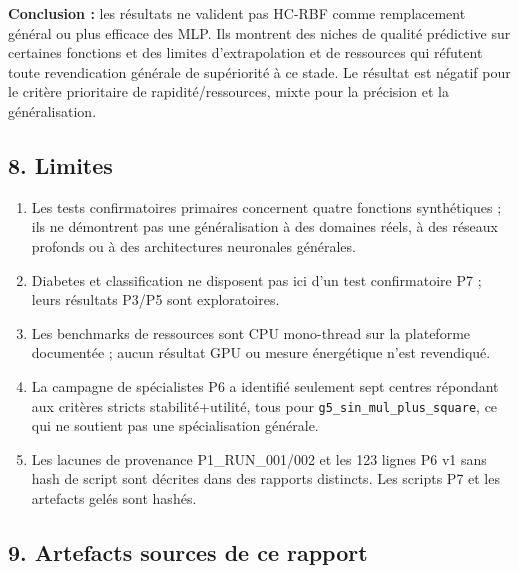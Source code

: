 \documentclass[
]{article}
\providecommand{\tightlist}{%
  \setlength{\itemsep}{0pt}\setlength{\parskip}{0pt}}
\begin{document}
\textbf{Conclusion :} les résultats ne valident pas HC-RBF comme
remplacement général ou plus efficace des MLP. Ils montrent des niches
de qualité prédictive sur certaines fonctions et des limites
d'extrapolation et de ressources qui réfutent toute revendication
générale de supériorité à ce stade. Le résultat est négatif pour le
critère prioritaire de rapidité/ressources, mixte pour la précision et
la généralisation.

\subsection{8. Limites}\label{limites}

\begin{enumerate}
\def\labelenumi{\arabic{enumi}.}
\tightlist
\item
  Les tests confirmatoires primaires concernent quatre fonctions
  synthétiques ; ils ne démontrent pas une généralisation à des domaines
  réels, à des réseaux profonds ou à des architectures neuronales
  générales.
\item
  Diabetes et classification ne disposent pas ici d'un test
  confirmatoire P7 ; leurs résultats P3/P5 sont exploratoires.
\item
  Les benchmarks de ressources sont CPU mono-thread sur la plateforme
  documentée ; aucun résultat GPU ou mesure énergétique n'est
  revendiqué.
\item
  La campagne de spécialistes P6 a identifié seulement sept centres
  répondant aux critères stricts stabilité+utilité, tous pour
  \texttt{g5\_sin\_mul\_plus\_square}, ce qui ne soutient pas une
  spécialisation générale.
\item
  Les lacunes de provenance P1\_RUN\_001/002 et les 123 lignes P6 v1
  sans hash de script sont décrites dans des rapports distincts. Les
  scripts P7 et les artefacts gelés sont hashés.
\end{enumerate}

\subsection{9. Artefacts sources de ce
rapport}\label{artefacts-sources-de-ce-rapport}
\end{document}
